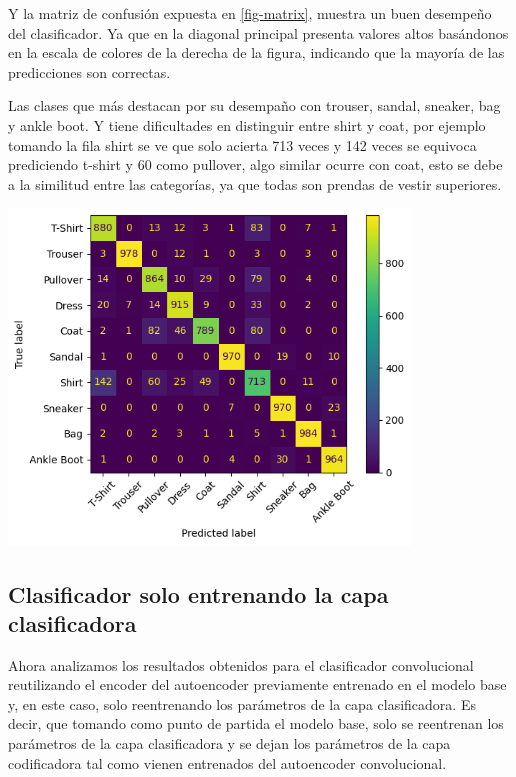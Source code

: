 \documentclass[aps,prl,reprint,groupedaddress]{revtex4-2}
\newenvironment{Figura}
  {\par\medskip\noindent\minipage{\linewidth}}
  {\endminipage\par\medskip}
\begin{document}
Y la matriz de confusión expuesta en \ref{fig-matrix}, muestra un buen desempeño 
del clasificador. Ya que en la diagonal principal presenta valores altos 
basándonos en la escala de colores de la derecha de la figura, indicando que la 
mayoría de las predicciones son correctas.

Las clases que más destacan por su desempaño con trouser, sandal, sneaker, bag 
y ankle boot. Y tiene dificultades en distinguir entre shirt y coat, por ejemplo 
tomando la fila shirt se ve que solo acierta 713 veces y 142 veces se 
equivoca prediciendo t-shirt y 60 como pullover, algo similar ocurre con coat, 
esto se debe a la similitud entre las categorías, ya que todas son prendas de 
vestir superiores.
\begin{Figura}
  \centering
  \includegraphics[width=0.80\textwidth]{figs1/matrix_confuncion_modelo_con_clasificador.png}
  \label{fig-matrix}
\end{Figura}

\subsection{Clasificador solo entrenando la capa clasificadora}

Ahora analizamos los resultados obtenidos para el clasificador convolucional
reutilizando el encoder del autoencoder previamente entrenado en el modelo base 
y, en este caso, solo reentrenando los parámetros de la capa clasificadora. 
Es decir, que tomando como punto de partida el modelo base, solo se reentrenan 
los parámetros de la capa clasificadora y se dejan los parámetros de la capa 
codificadora tal como vienen entrenados del autoencoder convolucional.
\end{document}

